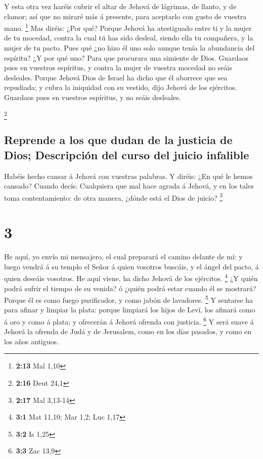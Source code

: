  Y esta otra vez haréis cubrir el altar de Jehová de
lágrimas, de llanto, y de clamor; así que no miraré más á presente, para
aceptarlo con gusto de vuestra mano. \footnote{\textbf{2:13} Mal 1,10}
 Mas diréis: ¿Por qué? Porque Jehová ha atestiguado entre
ti y la mujer de tu mocedad, contra la cual tú has sido desleal, siendo
ella tu compañera, y la mujer de tu pacto.  Pues qué ¿no
hizo él uno solo aunque tenía la abundancia del espíritu? ¿Y por qué
uno? Para que procurara una simiente de Dios. Guardaos pues en vuestros
espíritus, y contra la mujer de vuestra mocedad no seáis desleales.
 Porque Jehová Dios de Israel ha dicho que él aborrece que
sea repudiada; y cubra la iniquidad con su vestido, dijo Jehová de los
ejércitos. Guardaos pues en vuestros espíritus, y no seáis desleales.

\footnote{\textbf{2:16} Deut 24,1}

\hypertarget{reprende-a-los-que-dudan-de-la-justicia-de-dios-descripciuxf3n-del-curso-del-juicio-infalible}{%
\subsection{Reprende a los que dudan de la justicia de Dios; Descripción
del curso del juicio
infalible}\label{reprende-a-los-que-dudan-de-la-justicia-de-dios-descripciuxf3n-del-curso-del-juicio-infalible}}

 Habéis hecho cansar á Jehová con vuestras palabras. Y
diréis: ¿En qué le hemos cansado? Cuando decís: Cualquiera que mal hace
agrada á Jehová, y en los tales toma contentamiento: de otra manera,
¿dónde está el Dios de juicio? \footnote{\textbf{2:17} Mal 3,13-14}

\hypertarget{section-2}{%
\section{3}\label{section-2}}

 He aquí, yo envío mi mensajero, el cual preparará el camino
delante de mí: y luego vendrá á su templo el Señor á quien vosotros
buscáis, y el ángel del pacto, á quien deseáis vosotros. He aquí viene,
ha dicho Jehová de los ejércitos. \footnote{\textbf{3:1} Mat 11,10; Mar
  1,2; Luc 1,17}  ¿Y quién podrá sufrir el tiempo de su
venida? ó ¿quién podrá estar cuando él se mostrará? Porque él es como
fuego purificador, y como jabón de lavadores. \footnote{\textbf{3:2} Is
  1,25}  Y sentarse ha para afinar y limpiar la plata:
porque limpiará los hijos de Leví, los afinará como á oro y como á
plata; y ofrecerán á Jehová ofrenda con justicia. \footnote{\textbf{3:3}
  Zac 13,9}  Y será suave á Jehová la ofrenda de Judá y de
Jerusalem, como en los días pasados, y como en los años antiguos.

